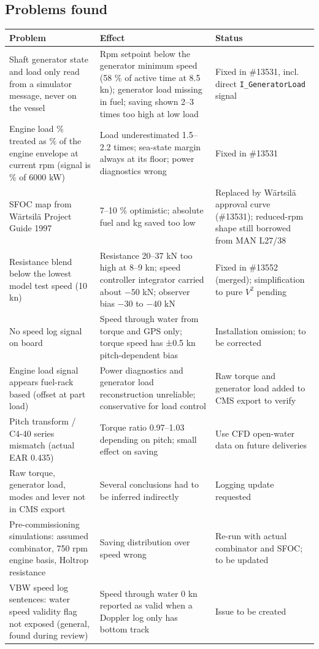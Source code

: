 \documentclass[a4paper,11pt]{article}
\begin{document}
\subsection{Problems found}
\label{sec:org6e8d50f}

\begin{center}
\footnotesize
\begin{tabular}{p{5.0cm}p{6.0cm}p{3.8cm}}
Problem & Effect & Status\\[0pt]
\hline
Shaft generator state and load only read from a simulator message, never on the vessel & Rpm setpoint below the generator minimum speed (58 \% of active time at 8.5 kn); generator load missing in fuel; saving shown 2--3 times too high at low load & Fixed in \#13531, incl. direct \texttt{I\_GeneratorLoad} signal\\[0pt]
Engine load \% treated as \% of the engine envelope at current rpm (signal is \% of 6000 kW) & Load underestimated 1.5--2.2 times; sea-state margin always at its floor; power diagnostics wrong & Fixed in \#13531\\[0pt]
SFOC map from Wärtsilä Project Guide 1997 & 7--10 \% optimistic; absolute fuel and kg saved too low & Replaced by Wärtsilä approval curve (\#13531); reduced-rpm shape still borrowed from MAN L27/38\\[0pt]
Resistance blend below the lowest model test speed (10 kn) & Resistance 20--37 kN too high at 8--9 kn; speed controller integrator carried about \(-50\) kN; observer bias \(-30\) to \(-40\) kN & Fixed in \#13552 (merged); simplification to pure \(V^2\) pending\\[0pt]
No speed log signal on board & Speed through water from torque and GPS only; torque speed has ±0.5 kn pitch-dependent bias & Installation omission; to be corrected\\[0pt]
Engine load signal appears fuel-rack based (offset at part load) & Power diagnostics and generator load reconstruction unreliable; conservative for load control & Raw torque and generator load added to CMS export to verify\\[0pt]
Pitch transform / C4-40 series mismatch (actual EAR 0.435) & Torque ratio 0.97--1.03 depending on pitch; small effect on saving & Use CFD open-water data on future deliveries\\[0pt]
Raw torque, generator load, modes and lever not in CMS export & Several conclusions had to be inferred indirectly & Logging update requested\\[0pt]
Pre-commissioning simulations: assumed combinator, 750 rpm engine basis, Holtrop resistance & Saving distribution over speed wrong & Re-run with actual combinator and SFOC; to be updated\\[0pt]
VBW speed log sentences: water speed validity flag not exposed (general, found during review) & Speed through water 0 kn reported as valid when a Doppler log only has bottom track & Issue to be created\\[0pt]
\end{tabular}
\end{center}
\end{document}
